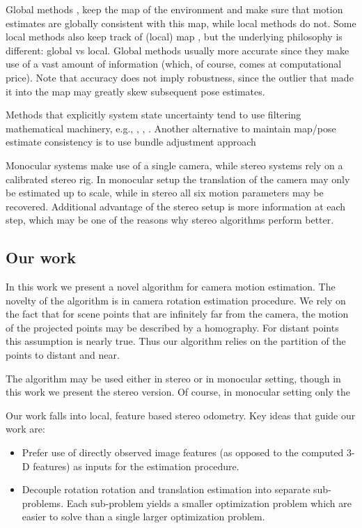 \documentclass[runningheads]{llncs}
\begin{document}
Global methods \cite{Klein2007}, \cite{Newcombe2011} keep the map of
the environment and make sure that motion estimates are globally
consistent with this map, while local methods do not.  Some local
methods \cite{Badino2013} also keep track of (local) map , but the
underlying philosophy is different: global vs local.  Global methods
usually more accurate since they make use of a vast amount of
information (which, of course, comes at computational price).  Note
that accuracy does not imply robustness, since the outlier that made
it into the map may greatly skew subsequent pose estimates.

Methods that explicitly system state uncertainty tend to use filtering
mathematical machinery, e.g., \cite{Konolige2010}, \cite{Olson2003},
\cite{Kaess2008}.  Another alternative to maintain map/pose estimate
consistency is to use bundle adjustment approach \cite{Triggs2000}

Monocular systems \cite{Song} make use of a single camera, while
stereo systems \cite{Geiger2011} rely on a calibrated stereo rig. In
monocular setup the translation of the camera may only be estimated up
to scale, while in stereo all six motion parameters may be
recovered. Additional advantage of the stereo setup is more
information at each step, which may be one of the reasons why stereo
algorithms perform better.

\subsection{Our work}

In this work we present a novel algorithm for camera motion
estimation.  The novelty of the algorithm is in camera rotation
estimation procedure.  We rely on the fact that for scene points that
are infinitely far from the camera, the motion of the projected points
may be described by a homography. For distant points this assumption
is nearly true.  Thus our algorithm relies on the partition of the
points to distant and near.

The algorithm may be used either in stereo or in monocular setting,
though in this work we present the stereo version.  Of course, in monocular setting only the 

  Our work falls into local, feature based stereo
odometry. Key ideas that guide our work are:
\begin{itemize}
\item Prefer use of directly observed image features (as opposed to
  the computed 3-D features) as inputs for the estimation procedure.
\item Decouple rotation rotation and translation estimation into
  separate sub-problems.  Each sub-problem yields a smaller
  optimization problem which are easier to solve than a single larger
  optimization problem.
\end{itemize}
\end{document}
